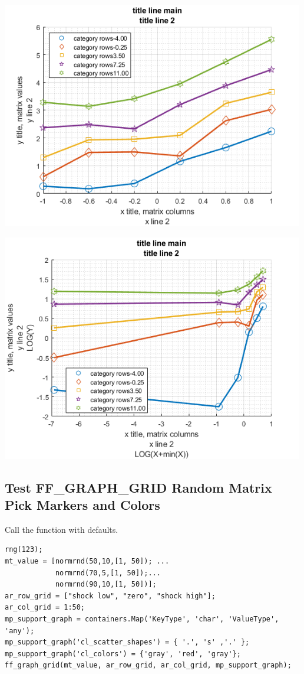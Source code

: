 \documentclass[
]{book}
\begin{document}
\includegraphics[width=5.20833in,height=\textheight]{img/fx_graph_grid_images/figure_0.png}

\includegraphics[width=5.20833in,height=\textheight]{img/fx_graph_grid_images/figure_1.png}

\hypertarget{test-ff_graph_grid-random-matrix-pick-markers-and-colors}{%
\subsection{Test FF\_GRAPH\_GRID Random Matrix Pick Markers and Colors}\label{test-ff_graph_grid-random-matrix-pick-markers-and-colors}}

Call the function with defaults.

\begin{verbatim}
rng(123);
mt_value = [normrnd(50,10,[1, 50]); ...
            normrnd(70,5,[1, 50]);...
            normrnd(90,10,[1, 50])];
ar_row_grid = ["shock low", "zero", "shock high"];
ar_col_grid = 1:50;
mp_support_graph = containers.Map('KeyType', 'char', 'ValueType', 'any');
mp_support_graph('cl_scatter_shapes') = { '.', 's' ,'.' };
mp_support_graph('cl_colors') = {'gray', 'red', 'gray'};
ff_graph_grid(mt_value, ar_row_grid, ar_col_grid, mp_support_graph);
\end{verbatim}
\end{document}
